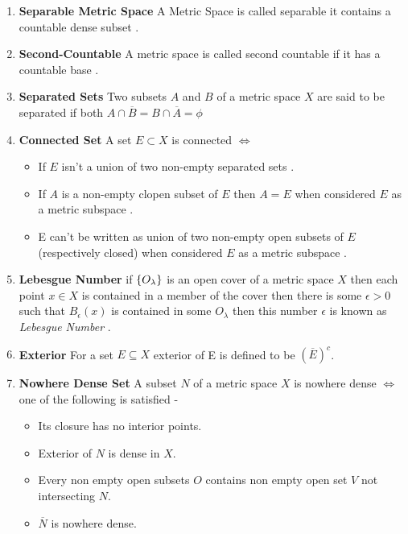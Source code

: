 \begin{enumerate}
	\item \textbf{Separable Metric Space }  A Metric Space is called separable it contains a countable dense subset .
	\item  \textbf{Second-Countable} A metric space is called second countable if it has a countable base . 
	\item  \textbf{ Separated Sets } Two subsets $A$ and $B$ of a metric space $X$ are said to be separated if both $A\cap \overline{B} = B\cap \overline{A} = \phi$
	\item  \textbf{Connected Set} A set $E\subset X$ is connected $\iff$
	\begin{itemize}
		\item If $E$ isn't a union of two non-empty separated  sets .
		\item  If $A$ is a non-empty clopen subset of $E$ then $A=E$ when considered $E$ as a metric subspace .
		\item  E can't be written as union of two non-empty open subsets of $E$ (respectively closed) when considered $E$ as a metric subspace .  
	\end{itemize} 

	\item \textbf{Lebesgue Number} if $\left\{O_{\lambda}\right\}$ is an open cover of a metric space $X$ then each point $x\in X$ is contained in a member of the cover then there is some $\epsilon>0$ such that $B_{\epsilon}(x)$ is contained in some $O_{\lambda}$ then this number $\epsilon$ is known as \textit{Lebesgue Number} .
	\item \textbf{Exterior} For a set $E\subseteq X$ exterior of E is defined to be $(\overline{E})^{c}$. 
	\item \textbf{Nowhere Dense Set} A subset $N$  of a metric space $X$ is nowhere dense $\iff$ one of the following is satisfied - 
	\begin{itemize}
		\item Its closure has no interior points.
		
		\item Exterior of $N$ is dense in $X$.
		\item  Every non empty open subsets $O$ contains non empty open set $V$ not intersecting $N$.
		\item  $\overline{N} $ is nowhere dense.
	\end{itemize}
\end{enumerate}